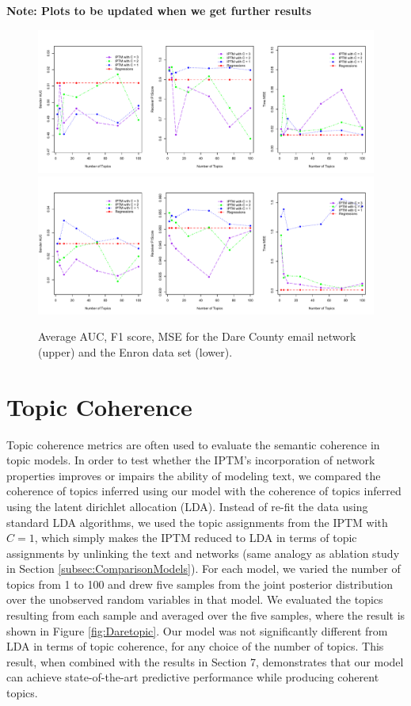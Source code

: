 \documentclass[a4paper]{article}
\begin{document}
\textbf{Note: Plots to be updated when we get further results}
\begin{figure}[ht]
	\centering
	\includegraphics[width=1\textwidth]{plots/Dare_PPE.pdf}  
		\includegraphics[width=1\textwidth]{plots/Enron_PPE.pdf}  
	\label{fig:PPE}
	\caption{Average AUC, F1 score, MSE for the Dare County email network (upper) and the Enron data set (lower).}
\end{figure}

\section{Topic Coherence} \label{sec:topiccoherence}
Topic coherence metrics \cite{mimno2011optimizing} are often used to evaluate the semantic coherence in topic models. In order to test whether the IPTM's incorporation of network properties improves or impairs the ability of modeling text, we compared the coherence of topics inferred using our model with the coherence of topics inferred using the latent dirichlet allocation (LDA). Instead of re-fit the data using standard LDA algorithms, we used the topic assignments from the IPTM with $C=1$, which simply makes the IPTM reduced to LDA in terms of topic assignments by unlinking the text and networks (same analogy as ablation study in Section \ref{subsec:ComparisonModels}). For each model, we varied the number of topics from 1 to 100 and drew five samples from the joint posterior distribution over the unobserved random variables in that model. We evaluated the topics resulting from each sample and averaged over the five samples, where the result is shown in Figure \ref{fig:Daretopic}. Our model was not significantly different from LDA in terms of topic coherence, for any choice of the number of topics. This result, when combined with the results in Section 7, demonstrates that our model can achieve state-of-the-art predictive performance while producing coherent topics. 
\end{document}

